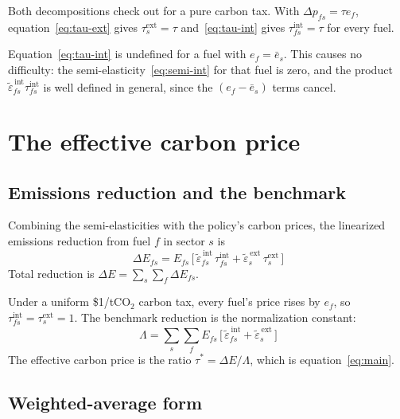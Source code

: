 \documentclass[11pt,a4paper]{article}
\begin{document}
Both decompositions check out for a pure carbon tax. With $\Delta p_{fs} = \tau e_f$, equation~\eqref{eq:tau-ext} gives $\tau^{\mathrm{ext}}_s = \tau$ and~\eqref{eq:tau-int} gives $\tau^{\mathrm{int}}_{fs} = \tau$ for every fuel.

Equation~\eqref{eq:tau-int} is undefined for a fuel with $e_f = \bar{e}_s$. This causes no difficulty: the semi-elasticity~\eqref{eq:semi-int} for that fuel is zero, and the product $\tilde{\varepsilon}^{\,\mathrm{int}}_{fs}\tau^{\mathrm{int}}_{fs}$ is well defined in general, since the $(e_f-\bar{e}_s)$ terms cancel.

\newpage
\section{The effective carbon price}\label{sec:ecp}

\subsection{Emissions reduction and the benchmark}

Combining the semi-elasticities with the policy's carbon prices, the linearized emissions reduction from fuel $f$ in sector $s$ is
\begin{equation}\label{eq:dE}
\Delta E_{fs} = E_{fs}\,\big[\,\tilde{\varepsilon}^{\,\mathrm{int}}_{fs}\,\tau^{\mathrm{int}}_{fs} + \tilde{\varepsilon}^{\,\mathrm{ext}}_{s}\,\tau^{\mathrm{ext}}_{s}\,\big]
\end{equation}
Total reduction is $\Delta E = \sum_s\sum_f \Delta E_{fs}$.

Under a uniform \$1/tCO$_2$ carbon tax, every fuel's price rises by $e_f$, so $\tau^{\mathrm{int}}_{fs} = \tau^{\mathrm{ext}}_s = 1$. The benchmark reduction is the normalization constant:
\begin{equation}\label{eq:lambda}
\Lambda = \textstyle\sum_s\sum_f E_{fs}\,\big[\,\tilde{\varepsilon}^{\,\mathrm{int}}_{fs} + \tilde{\varepsilon}^{\,\mathrm{ext}}_{s}\,\big]
\end{equation}
The effective carbon price is the ratio $\tau^* = \Delta E/\Lambda$, which is equation~\eqref{eq:main}.

\subsection{Weighted-average form}
\end{document}
